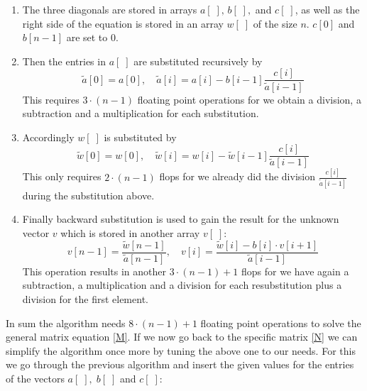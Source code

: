 \documentclass[11pt,a4wide]{article}
\begin{document}
\begin{enumerate}
	\item  The three diagonals are stored in arrays $a[\;],\,b[\;],$ and $c[\;]$, as well as the right side of the equation is stored in an array $w[\;]$ of the size $n$. $c[0]$ and $b[n-1]$ are set to 0.
	\item	Then the entries in $a[\;]$ are substituted recursively by
	\begin{equation}
	\tilde{a}[0]=a[0],\quad \tilde{a}[i]=a[i]-b[i-1]\dfrac{c[i]}{\tilde{a}[i-1]}
	\label{eq:3}
	\end{equation}
	This requires $3\cdot (n-1)$ floating point operations for we obtain a division, a subtraction and a multiplication for each substitution.
	\item Accordingly $w[\;]$ is substituted by
		\begin{equation}
	\tilde{w}[0]=w[0],\quad \tilde{w}[i]=w[i]-\tilde{w}[i-1]\dfrac{c[i]}{\tilde{a}[i-1]}
	\label{eq:4}
	\end{equation}
	This only requires $2\cdot (n-1)$ flops for we already did the division $\frac{c[i]}{\tilde{a}[i-1]}$ during the substitution above.
	\item Finally backward substitution is used to gain the result for the unknown vector $v$ which is stored in another array $v[\;]$:
		\begin{equation}
	v[n-1]=\dfrac{\tilde{w}[n-1]}{\tilde{a}[n-1]},\quad v[i]=\dfrac{\tilde{w}[i]-b[i]\cdot v[i+1]}{\tilde{a}[i-1]}
	\label{eq:5}
	\end{equation}
	This operation results in another $3\cdot(n-1)+1$ flops for we have again a subtraction, a multiplication and a division for each resubstitution plus a division for the first element.
\end{enumerate}
In sum the algorithm needs $8\cdot(n-1)+1$ floating point operations to solve the general matrix equation \ref{M}. 
If we now go back to the specific matrix \ref{N} we can simplify the algorithm once more by tuning the above one to our needs.  For this we go through the previous algorithm and insert the given values for the entries of the vectors $a[\;],\;b[\;]$ and $c[\;]$:
\end{document}
